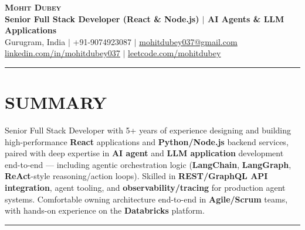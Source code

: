\documentclass[100pt,a4paper]{article}
\newcommand{\sectionline}{
\begin{center}
\vspace{-10pt}
\rule{1\textwidth}{0.5pt}
\end{center}
\vspace{1pt}
}
\begin{document}
\begin{center}
    \textbf{\Huge \scshape Mohit Dubey} \\ \vspace{4pt}
    \textbf{Senior Full Stack Developer (React \& Node.js) $|$ AI Agents \& LLM Applications} \\ \vspace{6pt}
    \small Gurugram, India $|$ +91-9074923087 $|$ \href{mailto:mohitdubey037@gmail.com}{\underline{mohitdubey037@gmail.com}} \\
    \href{https://www.linkedin.com/in/mohit-dubey-037/}{\underline{linkedin.com/in/mohitdubey037}} $|$ \href{https://leetcode.com/u/mohitdubey037/}
    {\underline{leetcode.com/mohitdubey}}
\end{center}

\sectionline
\section*{SUMMARY}
Senior Full Stack Developer with 5+ years of experience designing and building high-performance \textbf{React} applications and \textbf{Python/Node.js} backend services, paired with deep expertise in \textbf{AI agent} and \textbf{LLM application} development end-to-end — including agentic orchestration logic (\textbf{LangChain}, \textbf{LangGraph}, \textbf{ReAct}-style reasoning/action loops). Skilled in \textbf{REST/GraphQL API integration}, agent tooling, and \textbf{observability/tracing} for production agent systems. Comfortable owning architecture end-to-end in \textbf{Agile/Scrum} teams, with hands-on experience on the \textbf{Databricks} platform.

\sectionline
\end{document}
